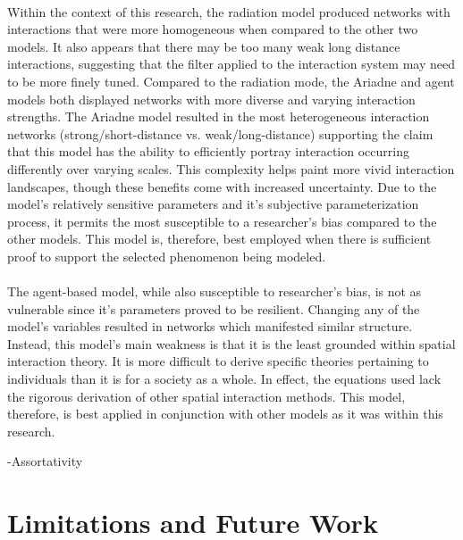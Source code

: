 \documentclass[12pt,a4paper]{thesis}
\begin{document}
\paragraph{{}}
Within the context of this research, the radiation model produced networks with interactions that were more homogeneous when compared to the other two models. It also appears that there may be too many weak long distance interactions, suggesting that the filter applied to the interaction system may need to be more finely tuned. Compared to the radiation mode, the Ariadne and agent models both displayed networks with more diverse and varying interaction strengths. The Ariadne model resulted in the most heterogeneous interaction networks (strong/short-distance vs. weak/long-distance) supporting the claim that this model has the ability to efficiently portray interaction occurring differently over varying scales. This complexity helps paint more vivid interaction landscapes, though these benefits come with increased uncertainty. Due to the model's relatively sensitive parameters and it's subjective parameterization process, it permits the most susceptible to a researcher's bias compared to the other models. This model is, therefore, best employed when there is sufficient proof to support the selected phenomenon being modeled.      

\paragraph{}
The agent-based model, while also susceptible to researcher's bias, is not as vulnerable since it's parameters proved to be resilient. Changing any of the model's variables resulted in networks which manifested similar structure. Instead, this model's main weakness is that it is the least grounded within spatial interaction theory. It is more difficult to derive specific theories pertaining to individuals than it is for a society as a whole. In effect, the equations used lack the rigorous derivation of other spatial interaction methods. This model, therefore, is best applied in conjunction with other models as it was within this research.   

-Assortativity

\section{Limitations and Future Work}
\end{document}
